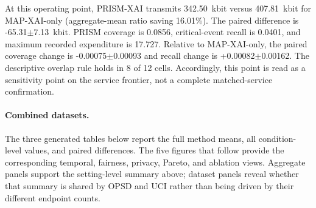 At this operating point, PRISM-XAI transmits 342.50~kbit versus 407.81~kbit for MAP-XAI-only (aggregate-mean ratio saving 16.01\%). The paired difference is -65.31$\pm$7.13~kbit. PRISM coverage is 0.0856, critical-event recall is 0.0401, and maximum recorded expenditure is 17.727. Relative to MAP-XAI-only, the paired coverage change is -0.00075$\pm$0.00093 and recall change is +0.00082$\pm$0.00162. The descriptive overlap rule holds in 8 of 12 cells. Accordingly, this point is read as a sensitivity point on the service frontier, not a complete matched-service confirmation.

\paragraph{Combined datasets.} The three generated tables below report the full method means, all condition-level values, and paired differences. The five figures that follow provide the corresponding temporal, fairness, privacy, Pareto, and ablation views. Aggregate panels support the setting-level summary above; dataset panels reveal whether that summary is shared by OPSD and UCI rather than being driven by their different endpoint counts.

\begin{table}[p]\centering\tiny

\caption{Public-score threshold $\tau=1$, release cap $M=16$, Combined datasets: complete generated method table.}

\label{tab:thr_1_cap_16:combined:main}

\resizebox{\linewidth}{!}{}

\end{table}\clearpage

\begin{table}[p]\centering\tiny

\caption{Public-score threshold $\tau=1$, release cap $M=16$, Combined datasets: complete condition-level generated table.}

\label{tab:thr_1_cap_16:combined:conditions}

\resizebox{\textwidth}{!}{}

\end{table}\clearpage

\begin{table}[p]\centering\tiny

\caption{Public-score threshold $\tau=1$, release cap $M=16$, Combined datasets: complete generated paired comparisons.}

\label{tab:thr_1_cap_16:combined:paired}

\resizebox{\textwidth}{!}{}

\end{table}\clearpage

